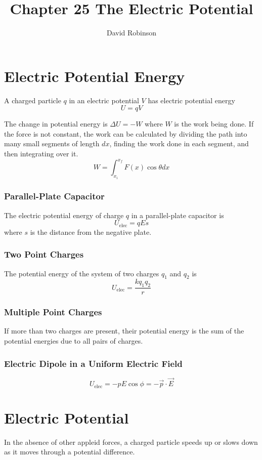 \documentclass{article}
\title{Chapter 25 The Electric Potential}
\author{David Robinson}
\date{}
\begin{document}
\maketitle

\section*{Electric Potential Energy}
A charged particle $q$ in an electric potential $V$ has electric potential energy \[U=qV\]

The change in potential energy is $\Delta U=-W$ where $W$ is the work being done. If the force is
not constant, the work can be calculated by dividing the path into many small segments of length
$dx$, finding the work done in each segment, and then integrating over it.
\[W=\int_{x_i}^{x_f}F(x)\cos\theta dx\]

\subsubsection*{Parallel-Plate Capacitor}
The electric potential energy of charge $q$ in a parallel-plate capacitor is
\[U_\text{elec}=qEs\] where $s$ is the distance from the negative plate.

\subsubsection*{Two Point Charges}
The potential energy of the system of two charges $q_1$ and $q_2$ is
\[U_\text{elec}=\frac{kq_1 q_2}{r}\]

\subsubsection*{Multiple Point Charges}
If more than two charges are present, their potential energy is the sum of the potential energies
due to all pairs of charges.

\subsubsection*{Electric Dipole in a Uniform Electric Field}
\[U_\text{elec}=-pE\cos\phi=-\vec{p}\cdot \vec{E}\]

\section*{Electric Potential}
In the absence of other appleid forces, a charged particle speeds up or slows down as it moves
through a potential difference. 
\end{document}
